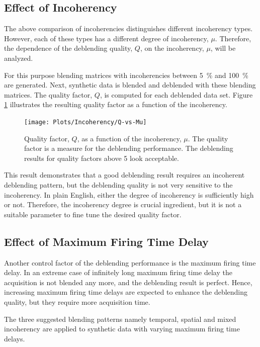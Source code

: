 \subsection*{Effect of Incoherency}

The above comparison of incoherencies distinguishes different incoherency types. However, each of these types has a different degree of incoherency, $\mu$. Therefore, the dependence of the deblending quality, $Q$, on the incoherency, $\mu$, will be analyzed.

For this purpose blending matrices with incoherencies between \SI{5}{\percent} and \SI{100}{\percent} are generated. Next, synthetic data is blended and deblended with these blending matrices. The quality factor, $Q$, is computed for each deblended data set. Figure \ref{fig:Ch-Results-QvsMu} illustrates the resulting quality factor as a function of the incoherency. 

\begin{figure}
	\centering
	\texttt{[image: Plots/Incoherency/Q-vs-Mu]}
	\caption{Quality factor, $Q$, as a function of the incoherency, $\mu$. The quality factor is a measure for the deblending performance. The deblending results for quality factors above 5 look acceptable.}
	\label{fig:Ch-Results-QvsMu}
\end{figure}

This result demonstrates that a good deblending result requires an incoherent deblending pattern, but the deblending quality is not very sensitive to the incoherency. In plain English, either the degree of incoherency is sufficiently high or not. Therefore, the incoherency degree is crucial ingredient, but it is not a suitable parameter to fine tune the desired quality factor.


\subsection*{Effect of Maximum Firing Time Delay}

Another control factor of the deblending performance is the maximum firing time delay. In an extreme case of infinitely long maximum firing time delay the acquisition is not blended any more, and the deblending result is perfect. Hence, increasing maximum firing time delays are expected to enhance the deblending quality, but they require more acquisition time.

The three suggested blending patterns namely temporal, spatial and mixed incoherency are applied to synthetic data with varying maximum firing time delays. 

